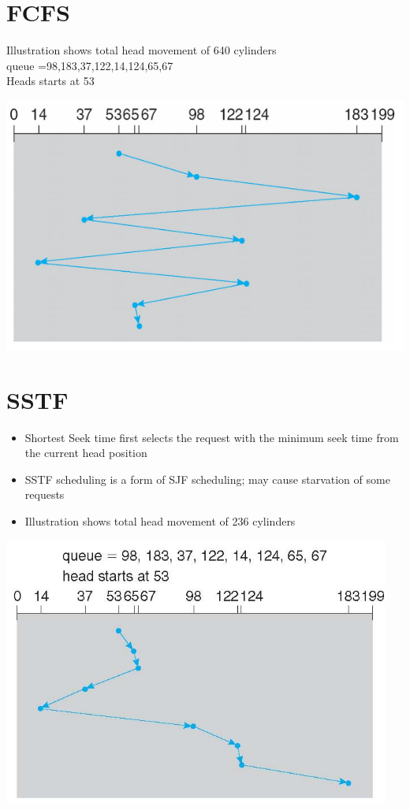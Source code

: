 \documentclass{article}[18pt]
\begin{document}
\section{FCFS}
Illustration shows total head movement of 640 cylinders\\
queue =98,183,37,122,14,124,65,67\\
Heads starts at 53
\begin{center}
	\includegraphics[scale=0.7]{FCFS}
\end{center}
\section{SSTF}
\begin{itemize}
	\item Shortest Seek time first selects the request with the minimum seek time from the current head position
	\item SSTF scheduling is a form of SJF scheduling; may cause starvation of some requests
	\item Illustration shows total head movement of 236 cylinders
\end{itemize}
\begin{center}
	\includegraphics[scale=0.7]{SSTF}
\end{center}
\end{document}
